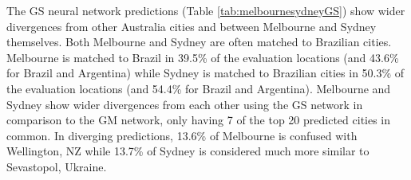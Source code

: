 \documentclass[10pt,letterpaper]{article}
\begin{document}
\begin{table}[!htbp]
\begin{adjustwidth}{-2.25in}{0in}
\begin{tabular}{ l l l l l}
\hline
\end{tabular}
\end{adjustwidth}
\end{table}

The GS neural network predictions (Table \ref{tab:melbournesydneyGS}) show wider divergences from other Australia cities and between Melbourne and Sydney themselves. Both Melbourne and Sydney are often matched to Brazilian cities. Melbourne is matched to Brazil in 39.5\% of the evaluation locations (and 43.6\% for Brazil and Argentina) while Sydney is matched to Brazilian cities in 50.3\% of the evaluation locations (and 54.4\% for Brazil and Argentina). Melbourne and Sydney show wider divergences from each other using the GS network in comparison to the GM network, only having 7 of the top 20 predicted cities in common. In diverging predictions, 13.6\% of Melbourne is confused with Wellington, NZ while 13.7\% of Sydney is considered much more similar to Sevastopol, Ukraine. 
\end{document}
